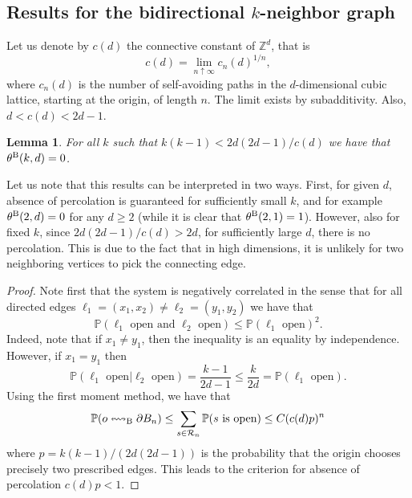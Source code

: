 \documentclass{article}
\newtheorem{lemma}[theorem]{Lemma}
\theoremstyle{definition}
\renewcommand{\P}{\mathbb{P}}
\newcommand{\1}{\mathbbm{1}}
\newcommand{\0}{\mathbf{o}}
\newcommand{\Z}{\mathbb{Z}}
\begin{document}
\subsection{Results for the bidirectional $k$-neighbor graph}\label{sec:B}
Let us denote by $c(d)$ the connective constant of $\Z^d$, that is $$c(d)=\lim_{n\uparrow\infty}c_n(d)^{1/n},$$
where $c_n(d)$ is the number of self-avoiding paths in the $d$-dimensional cubic lattice, starting at the origin, of length $n$. The limit exists by subadditivity. Also, $d<c(d)<2d-1$.  
\begin{lemma}\label{lemma-Bnoperc}
For all $k$ such that $k(k-1)<2d(2d-1)/c(d)$ we have that $\theta^{\rm B}(k,d)=0$.
\end{lemma}
Let us note that this results can be interpreted in two ways. First, for given $d$, absence of percolation is guaranteed for sufficiently small $k$, and for example $\theta^{\rm B}(2,d)=0$ for any $d\geq 2$ (while it is clear that $\theta^{\rm B}(2,1)=1$). However, also for fixed $k$, since $2d(2d-1)/c(d)>2d$, for sufficiently large $d$, there is no percolation. This is due to the fact that in high dimensions, it is unlikely for two neighboring vertices to pick the connecting edge. 
\begin{proof}
Note first that the system is negatively correlated in the sense that for all directed edges $\ell_1=(x_1,x_2)\neq\ell_2=(y_1,y_2)$ we have that
$$
\mathbb P(\ell_1\text{ open and }\ell_2\text{ open})\le \mathbb P(\ell_1\text{ open})^2.
$$
Indeed, note that if $x_1\neq y_1$, then the inequality is an equality by independence. However, if $x_1=y_1$ then 
$$
\mathbb P(\ell_1\text{ open}|\ell_2\text{ open})=\frac{k-1}{2d-1}\le \frac{k}{2d}=\mathbb P(\ell_1\text{ open}).
$$
Using the first moment method, we have that 
\begin{align*}
\P(o\leftrightsquigarrow_{\rm B}\partial B_n)\le \sum_{s\in \mathcal R_n}\P(s\text{ is open})\le C (c(d)p)^n 
\end{align*}
where $p=k(k-1)/(2d(2d-1))$ is the probability that the origin chooses precisely two prescribed edges. This leads to the criterion for absence of percolation $c(d)p<1$.
\end{proof}
\end{document}
